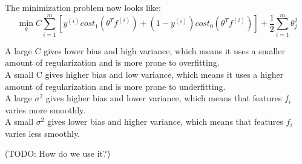 The minimization problem now looks like:
\begin{equation}
\min_{\theta}C \sum_{i=1}^{m}
\left[ y^{(i)}cost_1(\theta^Tf^{(i)})+(1-y^{(i)})cost_0(\theta^Tf^{(i)}) \right]
+ \frac{1}{2}\sum_{i=1}^{m}\theta^2_j
\end{equation}

A large C gives lower bias and high variance, which means it uses a smaller amount of regularization and is more prone to overfitting. \\
A small C gives higher bias and low variance, which means it uses a higher amount of regularization and is more prone to underfitting. \\
A large $\sigma^2$ gives higher bias and lower variance, which means that features $f_i$ varies more smoothly. \\
A small $\sigma^2$ gives lower bias and higher variance, which means that features $f_i$ varies less smoothly.

(TODO: How do we use it?)

